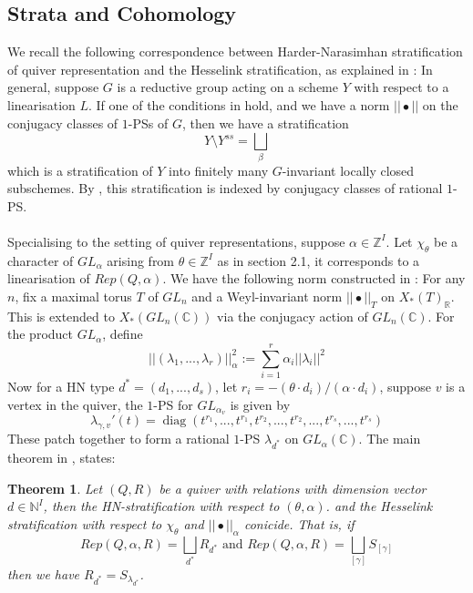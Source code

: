 \documentclass[12pt]{amsart}
\theoremstyle{plain}
\newtheorem{thm}{Theorem}[section]
\theoremstyle{definition}
\theoremstyle{remark}
\begin{document}
\subsection{Strata and Cohomology}
We recall the following correspondence between Harder-Narasimhan stratification of quiver representation and the Hesselink stratification, as explained in \cite{hoskins2018stratifications}:  In general, suppose $G$ is a reductive group acting on a scheme $Y$ with respect to a linearisation $L$. If one of the conditions in \cite[Section 2]{hoskins2018stratifications} hold, and we have a norm $||\bullet||$ on the conjugacy classes of $1$-PSs of $G$, then we have a stratification 
$$Y\setminus Y^{ss}=\bigsqcup_{\beta}$$
which is a stratification of $Y$ into finitely many $G$-invariant locally closed subschemes. By \cite[Remark 2.10]{hoskins2018stratifications}, this stratification is indexed by conjugacy classes of rational $1$-PS. 
\\~\\ Specialising to the setting of quiver representations, suppose $\alpha\in\mathbb Z^I$. Let $\chi_{\theta}$ be a character of $GL_{\alpha}$ arising from $\theta\in\mathbb Z^I$ as in section 2.1, it corresponds to a linearisation of $Rep(Q,\alpha)$. We have the following norm constructed in \cite[Example 2.4]{hoskins2018stratifications}: For any $n$, fix a maximal torus $T$ of $GL_{n}$ and a Weyl-invariant norm $||\bullet||_T$ on $X_{*}(T)_{\mathbb R}$. This is extended to $X_{*}(GL_{n}(\mathbb C))$ via the conjugacy action of $GL_{n}(\mathbb C)$. For the product $GL_{\alpha}$, define
$$||(\lambda_1,...,\lambda_r)||_{\alpha}^2:=\sum_{i=1}^r\alpha_i||\lambda_i||^2$$
Now for a HN type $d^*=(d_1,...,d_s)$, let $r_i=-(\theta\cdot d_i)/(\alpha\cdot d_i)$, 
suppose $v$ is a vertex in the quiver, the $1$-PS for $GL_{\alpha_v}$ is given by 
$$\lambda_{\gamma,v}'(t)=\operatorname{diag}(t^{r_1},...,t^{r_1},t^{r_2},...,t^{r_2},...,t^{r_s},...,t^{r_s})$$
These patch together to form a rational $1$-PS $\lambda_{d^*}$ on $GL_{\alpha}(\mathbb C)$. The main theorem in \cite{hoskins2014stratifications},\cite{hoskins2018stratifications} states:
\begin{thm}
\cite[Theorem 3.8]{hoskins2018stratifications} Let $(Q,R)$ be a quiver with relations with dimension vector $d\in\mathbb N^I$, then the HN-stratification with respect to $(\theta,\alpha)$.  and the Hesselink stratification with respect to $\chi_{\theta}$ and $||\bullet||_{\alpha}$ conicide. That is, if 
$$Rep(Q,\alpha,R)=\bigsqcup_{d^*}R_{d^*}\text{ and }Rep(Q,\alpha,R)=\bigsqcup_{[\gamma]}S_{[\gamma]}$$
then we have $R_{d^*}=S_{\lambda_{d^*}}$.
\end{thm}
\end{document}
